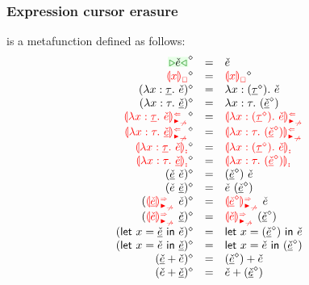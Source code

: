 \documentclass[formalism.tex]{subfiles}
\begin{document}
\subsubsection{Expression cursor erasure}
\label{sec:typed-expression-cursor-erasure}
\judgbox{\ensuremath{\cursorErase{\ZCMV}}} is a metafunction defined as follows:
%
\newcommand{\cursorErasesToRow}[2]{\ensuremath{\cursorErase{#1} & = & #2}}
\[\begin{array}{rcl}
  \cursorErasesToRow{\ZCCursor{\ECMV}}{\ECMV} \\
  \cursorErasesToRow{\ZCFree{x}}{\cursorErase{\ECFree{x}}} \\
  \cursorErasesToRow{(\ZCLamT{x}{\ZTMV}{\ECMV})}{\ECLam{x}{(\cursorErase{\ZTMV})}{\ECMV}} \\
  \cursorErasesToRow{(\ZCLamE{x}{\TMV}{\ZCMV})}{\ECLam{x}{\TMV}{(\cursorErase{\ZCMV})}} \\
  \cursorErasesToRow{\ZCLamAnaNonMatchedArrowT{x}{\ZTMV}{\ECMV}}{\ECLamAnaNonMatchedArrow{x}{(\cursorErase{\ZTMV})}{\ECMV}} \\
  \cursorErasesToRow{\ZCLamAnaNonMatchedArrowE{x}{\TMV}{\ZCMV}}{\ECLamAnaNonMatchedArrow{x}{\TMV}{(\cursorErase{\ZCMV})}} \\
  \cursorErasesToRow{\ZCLamInconAscT{x}{\ZTMV}{\ECMV}}{\ECLamInconAsc{x}{(\cursorErase{\ZTMV})}{\ECMV}} \\
  \cursorErasesToRow{\ZCLamInconAscE{x}{\TMV}{\ZCMV}}{\ECLamInconAsc{x}{\TMV}{(\cursorErase{\ZCMV})}} \\
  \cursorErasesToRow{(\ZCApL{\ZCMV}{\ECMV})}{\ECAp{(\cursorErase{\ZCMV})}{\ECMV}} \\
  \cursorErasesToRow{(\ZCApR{\ECMV}{\ZCMV})}{\ECAp{\ECMV}{(\cursorErase{\ZCMV})}} \\
  \cursorErasesToRow{(\ZCApSynNonMatchedArrowL{\ZCMV}{\ECMV})}{\ECApSynNonMatchedArrow{\cursorErase{\ZCMV}}{\ECMV}} \\
  \cursorErasesToRow{(\ZCApSynNonMatchedArrowR{\ECMV}{\ZCMV})}{\ECApSynNonMatchedArrow{\ECMV}{(\cursorErase{\ZCMV})}} \\
  \cursorErasesToRow{(\ZCLetL{x}{\ZCMV}{\ECMV})}{\ECLet{x}{(\cursorErase{\ZCMV})}{\ECMV}} \\
  \cursorErasesToRow{(\ZCLetR{x}{\ECMV}{\ZCMV})}{\ECLet{x}{\ECMV}{(\cursorErase{\ZCMV})}} \\
  \cursorErasesToRow{(\ZCPlusL{\ZCMV}{\ECMV})}{\ECPlus{(\cursorErase{\ZCMV})}{\ECMV}} \\
  \cursorErasesToRow{(\ZCPlusR{\ECMV}{\ZCMV})}{\ECPlus{\ECMV}{(\cursorErase{\ZCMV})}} \\

\end{array}\]
\end{document}
